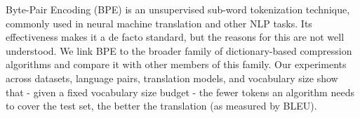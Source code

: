 Byte-Pair Encoding (BPE) is an unsupervised sub-word tokenization technique, commonly used in neural machine translation and other NLP tasks.
Its effectiveness makes it a de facto standard, but the reasons for this are not well understood.
We link BPE to the broader family of dictionary-based compression algorithms and compare it with other members of this family.
Our experiments across datasets, language pairs, translation models, and vocabulary size show that - given a fixed vocabulary size budget - the fewer tokens an algorithm needs to cover the test set, the better the translation (as measured by BLEU).